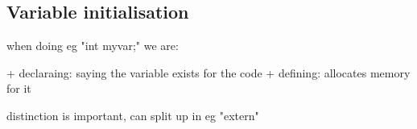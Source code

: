 
\subsection{Variable initialisation}


when doing eg "int myvar;" we are:

+ declaraing: saying the variable exists for the code
+ defining: allocates memory for it

distinction is important, can split up in eg "extern"


